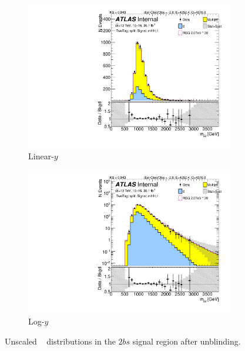 \begin{figure}[htb!]
\begin{center}
    \captionsetup{justification=centering}
    \begin{subfigure}[b]{0.45\textwidth}
        \includegraphics[width=\textwidth,angle=-90]{figures/boosted/Signal_Syst/Moriond_bkg_9_TwoTag_split_Signal_mHH_l.pdf}
        \caption{Linear-$y$}
        \label{fig:boosted-2b-signal-lin}
    \end{subfigure}
    \quad
    \begin{subfigure}[b]{0.45\textwidth}
        \includegraphics[width=\textwidth,angle=-90]{figures/boosted/Signal_Syst/Moriond_bkg_9_TwoTag_split_Signal_mHH_l_1.pdf}
        \caption{Log-$y$}
        \label{fig:boosted-2b-signal-log}
    \end{subfigure}
  \caption{Unscaled \mtwoJ~ distributions in the $2bs$ signal region after unblinding.}
  \label{fig:boosted-2b-signal-l}
\end{center}
\end{figure}


